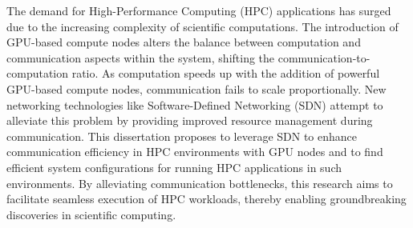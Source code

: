 The demand for High-Performance Computing (HPC) applications has surged due to
the increasing complexity of scientific computations. The introduction of
GPU-based compute nodes
alters the balance between computation and communication aspects within the
system, shifting the communication-to-computation ratio.
As computation speeds up with the addition of powerful GPU-based compute
nodes, communication fails to scale proportionally. New networking
technologies like Software-Defined Networking (SDN) attempt to alleviate
this problem by providing
improved resource management during communication.
This dissertation proposes to leverage SDN to enhance
communication efficiency in HPC environments with GPU nodes
and to find efficient system configurations for running
HPC applications in such environments. By alleviating communication
bottlenecks, this research aims to facilitate seamless execution of HPC
workloads, thereby enabling groundbreaking discoveries in scientific computing.

